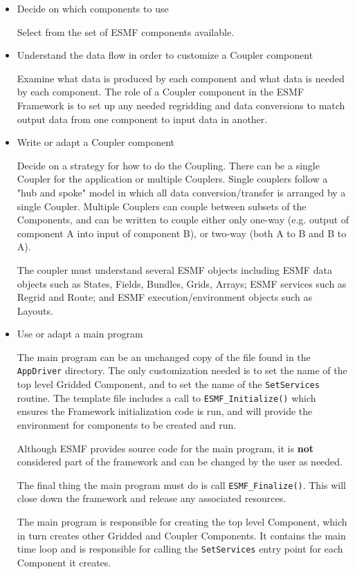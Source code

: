 \begin{itemize}

\item Decide on which components to use 

Select from the set of ESMF components available.

\item Understand the data flow in order to customize a Coupler component

Examine what data is produced by each component and what data is
needed by each component.  The role of a Coupler component in the
ESMF Framework is to set up any needed regridding and data conversions
to match output data from one component to input data in another.

\item Write or adapt a Coupler component

Decide on a strategy for how to do the Coupling.  There can be a single
Coupler for the application or multiple Couplers.
Single couplers follow a "hub and
spoke" model in which all data conversion/transfer is arranged
by a single Coupler.
Multiple Couplers can couple between subsets of the Components, and
can be written to couple either only one-way
(e.g. output of component A into input of component B), or two-way
(both A to B and B to A).  

The coupler must understand several ESMF objects including ESMF data objects
such as States, Fields, Bundles, Grids, Arrays; ESMF services
such as Regrid and Route; and ESMF execution/environment objects
such as Layouts.    

\item Use or adapt a main program 

The main program can be an unchanged copy of the file found in
the {\tt AppDriver} directory.  The only customization needed is to
set the name of the top level Gridded Component, and to set the
name of the {\tt SetServices} routine.  The template file includes
a call to {\tt ESMF\_Initialize()} which ensures the Framework
initialization code is run, and will
provide the environment for components to be created and run.

Although ESMF provides source code for the main program, it is
{\bf not} considered part of the framework and can be changed by
the user as needed.

The final thing the main program must do is call {\tt ESMF\_Finalize()}.
This will close down the framework and release any associated resources.

The main program is responsible for creating the top level
Component, which in turn creates other Gridded and Coupler Components.  
It contains the main time loop and is responsible for calling the
{\tt SetServices} entry point for each Component it creates.

\end{itemize}



